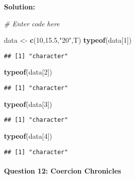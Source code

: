\documentclass[
]{article}
\newenvironment{Shaded}{\begin{snugshade}}{\end{snugshade}}
\newcommand{\CommentTok}[1]{\textcolor[rgb]{0.56,0.35,0.01}{\textit{#1}}}
\newcommand{\DecValTok}[1]{\textcolor[rgb]{0.00,0.00,0.81}{#1}}
\newcommand{\FloatTok}[1]{\textcolor[rgb]{0.00,0.00,0.81}{#1}}
\newcommand{\FunctionTok}[1]{\textcolor[rgb]{0.13,0.29,0.53}{\textbf{#1}}}
\newcommand{\NormalTok}[1]{#1}
\newcommand{\OtherTok}[1]{\textcolor[rgb]{0.56,0.35,0.01}{#1}}
\newcommand{\StringTok}[1]{\textcolor[rgb]{0.31,0.60,0.02}{#1}}
\begin{document}
\textbf{Solution:}

\begin{Shaded}
\begin{Highlighting}[]
\CommentTok{\# Enter code here}

\NormalTok{data }\OtherTok{\textless{}{-}} \FunctionTok{c}\NormalTok{(}\DecValTok{10}\NormalTok{,}\FloatTok{15.5}\NormalTok{,}\StringTok{"20"}\NormalTok{,T)}
\FunctionTok{typeof}\NormalTok{(data[}\DecValTok{1}\NormalTok{])}
\end{Highlighting}
\end{Shaded}

\begin{verbatim}
## [1] "character"
\end{verbatim}

\begin{Shaded}
\begin{Highlighting}[]
\FunctionTok{typeof}\NormalTok{(data[}\DecValTok{2}\NormalTok{])}
\end{Highlighting}
\end{Shaded}

\begin{verbatim}
## [1] "character"
\end{verbatim}

\begin{Shaded}
\begin{Highlighting}[]
\FunctionTok{typeof}\NormalTok{(data[}\DecValTok{3}\NormalTok{])}
\end{Highlighting}
\end{Shaded}

\begin{verbatim}
## [1] "character"
\end{verbatim}

\begin{Shaded}
\begin{Highlighting}[]
\FunctionTok{typeof}\NormalTok{(data[}\DecValTok{4}\NormalTok{])}
\end{Highlighting}
\end{Shaded}

\begin{verbatim}
## [1] "character"
\end{verbatim}

\hypertarget{question-12-coercion-chronicles}{%
\paragraph{Question 12: Coercion
Chronicles}\label{question-12-coercion-chronicles}}
\end{document}
